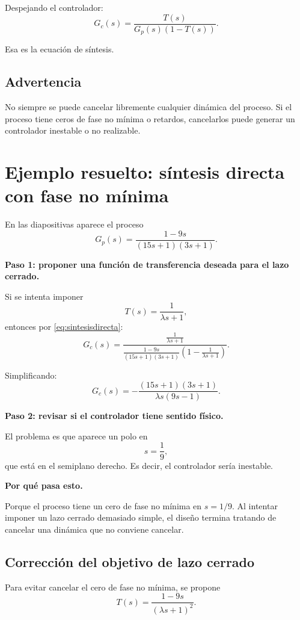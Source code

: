 \documentclass[11pt]{article}
\begin{document}
Despejando el controlador:
\begin{equation}
G_c(s)=\frac{T(s)}{G_p(s)\left(1-T(s)\right)}.
\label{eq:sintesisdirecta}
\end{equation}

Esa es la ecuaci\'on de s\'intesis.

\subsection{Advertencia}
No siempre se puede cancelar libremente cualquier din\'amica del proceso. Si el proceso tiene ceros de fase no m\'inima o retardos, cancelarlos puede generar un controlador inestable o no realizable.

\section{Ejemplo resuelto: s\'intesis directa con fase no m\'inima}
En las diapositivas aparece el proceso
\begin{equation}
G_p(s)=\frac{1-9s}{(15s+1)(3s+1)}.
\end{equation}

\textbf{Paso 1: proponer una funci\'on de transferencia deseada para el lazo cerrado.}

Si se intenta imponer
\begin{equation}
T(s)=\frac{1}{\lambda s+1},
\end{equation}
entonces por \eqref{eq:sintesisdirecta}:
\[
G_c(s)=\frac{\frac{1}{\lambda s+1}}{\frac{1-9s}{(15s+1)(3s+1)}\left(1-\frac{1}{\lambda s+1}\right)}.
\]

Simplificando:
\begin{equation}
G_c(s)= -\frac{(15s+1)(3s+1)}{\lambda s(9s-1)}.
\end{equation}

\textbf{Paso 2: revisar si el controlador tiene sentido f\'isico.}

El problema es que aparece un polo en
\[
s=\frac{1}{9},
\]
que est\'a en el semiplano derecho. Es decir, el controlador ser\'ia inestable.

\textbf{Por qu\'e pasa esto.}

Porque el proceso tiene un cero de fase no m\'inima en $s=1/9$. Al intentar imponer un lazo cerrado demasiado simple, el dise\~no termina tratando de cancelar una din\'amica que no conviene cancelar.

\subsection{Correcci\'on del objetivo de lazo cerrado}
Para evitar cancelar el cero de fase no m\'inima, se propone
\begin{equation}
T(s)=\frac{1-9s}{(\lambda s+1)^2}.
\end{equation}
\end{document}
